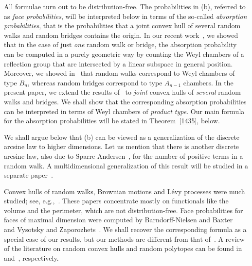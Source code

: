 \documentclass[12pt, reqno]{amsart}
\theoremstyle{plain}
\theoremstyle{definition}
\theoremstyle{remark}
\begin{document}
All formulae turn out to be distribution-free. The probabilities in (b), referred to as \emph{face probabilities}, will be interpreted below in terms of the so-called \emph{absorption probabilities}, that is the probabilities that a joint convex hull of several random walks and random bridges contains the origin. In our recent work~\cite{KVZ15}, we showed that in the case of just \emph{one} random walk or bridge, the absorption probability can be computed in a purely geometric way by counting the Weyl chambers of a reflection group that are intersected  by a linear subspace in general position. Moreover, we showed in~\cite{KVZ15} that random walks correspond to Weyl chambers of type $B_n$, whereas random bridges correspond to type $A_{n-1}$ chambers.
In the present paper, we extend the results of~\cite{KVZ15} to \emph{joint} convex hulls of \emph{several} random walks and bridges. We shall show that the corresponding absorption probabilities can be interpreted in terms of Weyl chambers of \emph{product type}. Our main  formula for the absorption probabilities will be stated in Theorem~\ref{1435}, below.

We shall argue below that (b) can be viewed as a generalization of the discrete arcsine law to higher dimensions. Let us mention that there is another discrete arcsine law, also due to Sparre Andersen~\cite[Theorem~C]{sparre_andersen2},  for the number of positive terms in a random walk. A multidimensional generalization of this result will be studied in a separate paper~\cite{KVZ16_arcsine}.

Convex hulls of random walks, Brownian motions and L\'evy processes were much studied; see, e.g.,\ \cite{Baxter,SW,SS,Nielsen,Eldan0,kampf_etal,MCR10,kabluchko_zaporozhets_sobolev,vysotsky_zaporozhets,molchanov_wespi,wade_xu}.  These papers concentrate mostly on functionals like the volume and the perimeter, which are not distribution-free. Face probabilities for faces of maximal dimension were computed by Barndorff-Nielsen and Baxter~\cite{Nielsen} and Vysotsky and Zaporozhets~\cite{vysotsky_zaporozhets}. We shall recover the corresponding formula as a special case of our results, but our methods are different from that of~\cite{Nielsen, vysotsky_zaporozhets}.
A review of the literature on random convex hulls and random polytopes can be found in~\cite{MCR10} and~\cite{schneider_polytopes}, respectively.
\end{document}
